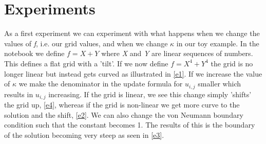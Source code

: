 \section{Experiments}
As a first experiment we can experiment with what happens when we change the values of \textit{f}, i.e. our grid values, and when we change $\kappa$ in our toy example. In the notebook we define $f = X+Y$ where \textit{X} and \textit{Y} are linear sequences of numbers. This defines a flat grid with a 'tilt'. If we now define $f = X^4+Y^4$ the grid is no longer linear but instead gets curved as illustrated in \autoref{e1}. If we increase the value of $\kappa$ we make the denominator in the update formula for $u_{i,j}$ smaller which results in $u_{i,j}$ increasing. If the grid is linear, we see this change simply 'shifts' the grid up, \autoref{e4}, whereas if the grid is non-linear we get more curve to the solution and the shift, \autoref{e2}. We can also change the von Neumann boundary condition such that the constant becomes 1. The results of this is the boundary of the solution becoming very steep as seen in \autoref{e3}.
